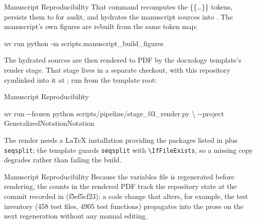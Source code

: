\documentclass[
  ignorenonframetext,
]{beamer}
\newenvironment{Shaded}{}{}
\newcommand{\AttributeTok}[1]{\textcolor[rgb]{0.49,0.56,0.16}{#1}}
\newcommand{\DataTypeTok}[1]{\textcolor[rgb]{0.56,0.13,0.00}{#1}}
\newcommand{\ExtensionTok}[1]{#1}
\newcommand{\NormalTok}[1]{#1}
\begin{document}
\begin{frame}{Manuscript Reproducibility}
That command recomputes the \{\{\ldots\}\} tokens, persists them to
 for audit, and hydrates
the manuscript sources into . The
manuscript's own figures are rebuilt from the same token map:

\begin{Shaded}
\begin{Highlighting}[]
\ExtensionTok{uv}\NormalTok{ run python }\AttributeTok{{-}m}\NormalTok{ scripts.manuscript\_build\_figures}
\end{Highlighting}
\end{Shaded}

The hydrated sources are then rendered to PDF by the docxology
template's render stage. That stage lives in a separate checkout, with
this repository symlinked into it at
; run from the
template root:

\end{frame}

\begin{frame}{Manuscript Reproducibility}
\begin{Shaded}
\begin{Highlighting}[]
\ExtensionTok{uv}\NormalTok{ run }\AttributeTok{{-}{-}frozen}\NormalTok{ python scripts/pipeline/stage\_03\_render.py }\DataTypeTok{\textbackslash{}}
  \AttributeTok{{-}{-}project}\NormalTok{ GeneralizedNotationNotation}
\end{Highlighting}
\end{Shaded}

The render needs a LaTeX installation providing the packages listed in
 plus \texttt{seqsplit}; the template
guards \texttt{seqsplit} with \texttt{\textbackslash{}IfFileExists}, so
a missing copy degrades rather than failing the build.

\end{frame}

\begin{frame}{Manuscript Reproducibility}
Because the variables file is regenerated before rendering, the counts
in the rendered PDF track the repository state at the commit recorded in
 (f5ef5cf23): a code
change that alters, for example, the test inventory (458 test files,
4905 test functions) propagates into the prose on the next regeneration
without any manual editing.
\end{frame}
\end{document}
